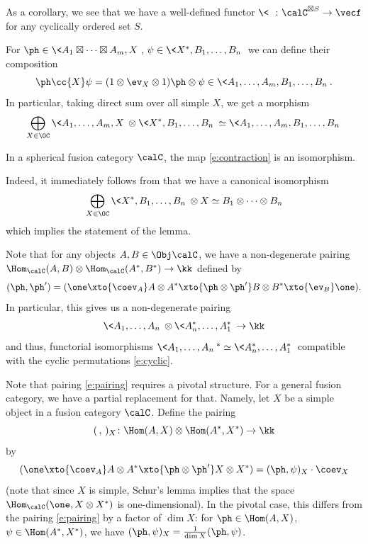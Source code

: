 As a corollary, we see that we have a well-defined functor
$\<\ \>\colon \calC^{\boxtimes S}\to \vecf$ for any cyclically ordered set $S$.


For $\ph\in \<A_1\boxtimes\dots\boxtimes A_m, X\>$,
$\psi \in \<X^*, B_1, \dots, B_n\>$ we can define their composition
\begin{equation}\label{e:composition}
  \ph\cc{X} \psi =(1\otimes\ev_X\otimes 1)\ph\otimes \psi\in
  \<A_1, \dots, A_m, B_1, \dots, B_n\>.
\end{equation}
In particular, taking direct sum over all simple $X$, we get a morphism
\begin{equation}\label{e:contraction}
  \bigoplus_{X\in \OC}\<A_1, \dots, A_m, X\>\otimes \<X^*, B_1, \dots, B_n\>
   \simeq \<A_1, \dots, A_m, B_1, \dots, B_n\>
\end{equation}


\begin{lemma}\label{l:contraction}
  In a spherical fusion category $\calC$, the map \eqref{e:contraction} is an
  isomorphism.
\end{lemma}
Indeed, it immediately follows from  that we have a canonical
isomorphism
$$
  \bigoplus_{X\in\OC} \<X^*, B_1, \dots, B_n\>\otimes X
  \simeq B_1\otimes \dots\otimes B_n
$$
which implies the statement of the lemma.

Note that for any objects $A,B\in \Obj \calC$, we have a
non-degenerate pairing $\Hom_\calC(A,B)\otimes \Hom_\calC(A^*,B^*)\to \kk$
defined by
\begin{equation}\label{e:pairing}
(\ph, \ph')=(\one\xto{\coev_A}A\otimes A^*\xto{\ph\otimes \ph'}
  B\otimes B^*\xto{\ev_B}\one).
\end{equation}
In particular, this gives us a non-degenerate pairing
\begin{equation}\label{e:dual}
\<A_1,\dots,A_n\>\otimes \<A_n^*,\dots,A_1^*\>\to \kk
\end{equation}
and thus, functorial isomorphisms $\<A_1,\dots,A_n\>^*\simeq
\<A_n^*,\dots,A_1^*\>$ compatible with the cyclic permutations
\eqref{e:cyclic}.

\begin{remark}\label{r:pairing-nonpivotal}
  Note that pairing \eqref{e:pairing} requires a pivotal structure. For a
  general fusion category, we have a partial replacement for that. Namely, let
  $X$ be a simple object in a fusion category $\calC$. Define the pairing
  \begin{equation}\label{e:pairing2}
  (\, , \,)_X\colon \Hom(A,X)\otimes \Hom(A^*, X^*)\to \kk
  \end{equation}
  by
  $$
    (\one\xto{\coev_A}A\otimes A^*\xto{\ph\otimes \ph'}X\otimes X^*)
    = (\ph, \psi)_X \cdot \coev_X
  $$
  (note that since $X$ is simple, Schur's lemma implies that the space
  $\Hom_\calC(\one, X\otimes X^*)$ is one-dimensional). In the pivotal case,
  this differs from the pairing \eqref{e:pairing} by a factor of $\dim X$:
  for $\ph\in \Hom(A,X)$, $\psi\in\Hom(A^*,X^*)$, we have
  $(\ph,\psi)_X=\frac{1}{\dim X} (\ph,\psi)$.
\end{remark}
